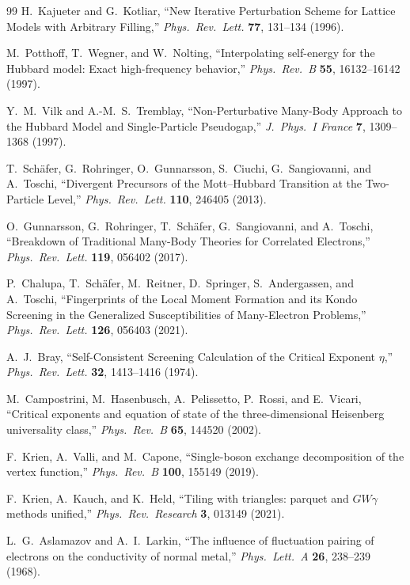 \documentclass[11pt,a4paper]{article}
\numberwithin{equation}{section}
\theoremstyle{plain}
\theoremstyle{definition}
\begin{document}
\begin{thebibliography}{99}
H.~Kajueter and G.~Kotliar,
``New Iterative Perturbation Scheme for Lattice Models with Arbitrary Filling,''
\textit{Phys.\ Rev.\ Lett.} \textbf{77}, 131--134 (1996).

M.~Potthoff, T.~Wegner, and W.~Nolting,
``Interpolating self-energy for the Hubbard model: Exact high-frequency behavior,''
\textit{Phys.\ Rev.\ B} \textbf{55}, 16132--16142 (1997).

Y.~M.~Vilk and A.-M.~S.~Tremblay,
``Non-Perturbative Many-Body Approach to the Hubbard Model and Single-Particle Pseudogap,''
\textit{J.\ Phys.\ I France} \textbf{7}, 1309--1368 (1997).

T.~Sch\"afer, G.~Rohringer, O.~Gunnarsson, S.~Ciuchi, G.~Sangiovanni, and A.~Toschi,
``Divergent Precursors of the Mott--Hubbard Transition at the Two-Particle Level,''
\textit{Phys.\ Rev.\ Lett.} \textbf{110}, 246405 (2013).

O.~Gunnarsson, G.~Rohringer, T.~Sch\"afer, G.~Sangiovanni, and A.~Toschi,
``Breakdown of Traditional Many-Body Theories for Correlated Electrons,''
\textit{Phys.\ Rev.\ Lett.} \textbf{119}, 056402 (2017).

P.~Chalupa, T.~Sch\"afer, M.~Reitner, D.~Springer, S.~Andergassen, and A.~Toschi,
``Fingerprints of the Local Moment Formation and its Kondo Screening in the Generalized Susceptibilities of Many-Electron Problems,''
\textit{Phys.\ Rev.\ Lett.} \textbf{126}, 056403 (2021).

A.~J.~Bray,
``Self-Consistent Screening Calculation of the Critical Exponent $\eta$,''
\textit{Phys.\ Rev.\ Lett.} \textbf{32}, 1413--1416 (1974).

M.~Campostrini, M.~Hasenbusch, A.~Pelissetto, P.~Rossi, and E.~Vicari,
``Critical exponents and equation of state of the three-dimensional Heisenberg universality class,''
\textit{Phys.\ Rev.\ B} \textbf{65}, 144520 (2002).

F.~Krien, A.~Valli, and M.~Capone,
``Single-boson exchange decomposition of the vertex function,''
\textit{Phys.\ Rev.\ B} \textbf{100}, 155149 (2019).

F.~Krien, A.~Kauch, and K.~Held,
``Tiling with triangles: parquet and $GW\gamma$ methods unified,''
\textit{Phys.\ Rev.\ Research} \textbf{3}, 013149 (2021).

L.~G.~Aslamazov and A.~I.~Larkin,
``The influence of fluctuation pairing of electrons on the conductivity of normal metal,''
\textit{Phys.\ Lett.\ A} \textbf{26}, 238--239 (1968).


\end{thebibliography}
\end{document}
